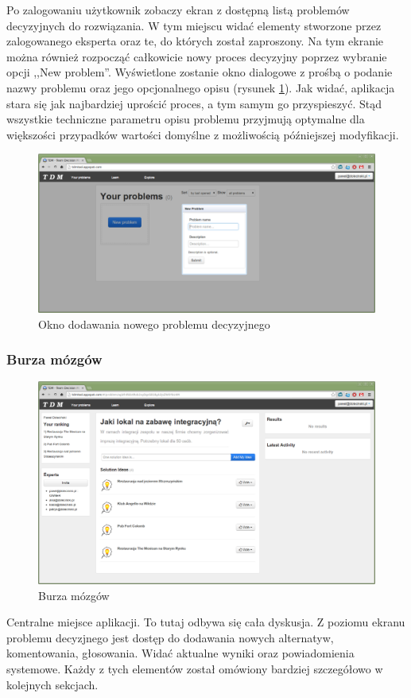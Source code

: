 Po zalogowaniu użytkownik zobaczy ekran z dostępną listą problemów decyzyjnych
do rozwiązania. W tym miejscu widać elementy stworzone przez zalogowanego
eksperta oraz te, do których został zaproszony. Na tym ekranie można również
rozpocząć całkowicie nowy proces decyzyjny poprzez wybranie opcji ,,New
problem''. Wyświetlone zostanie okno dialogowe z prośbą o podanie nazwy problemu
oraz jego opcjonalnego opisu (rysunek \ref{fig:new_problem}). Jak widać,
aplikacja stara się jak najbardziej uprościć proces, a tym samym go
przyspieszyć. Stąd wszystkie techniczne parametru opisu problemu przyjmują
optymalne dla większości przypadków wartości domyślne z możliwością późniejszej
modyfikacji.

\begin{figure}[!htbp]
  \includegraphics[width=\linewidth]
    {chapters/prototyp/tdm_new_problem}
  \caption{Okno dodawania nowego problemu decyzyjnego}
  \label{fig:new_problem}
\end{figure}

\subsubsection{Burza mózgów}
\begin{figure}[!htbp]
  \includegraphics[width=\linewidth]
    {chapters/prototyp/tdm_brainstorm}
  \caption{Burza mózgów}
  \label{fig:brainstorm}
\end{figure}
Centralne miejsce aplikacji. To tutaj odbywa się cała dyskusja. Z poziomu ekranu
problemu decyzjnego jest dostęp do dodawania nowych alternatyw, komentowania,
głosowania. Widać aktualne wyniki oraz powiadomienia systemowe. Każdy z tych
elementów został omówiony bardziej szczegółowo w kolejnych sekcjach.

